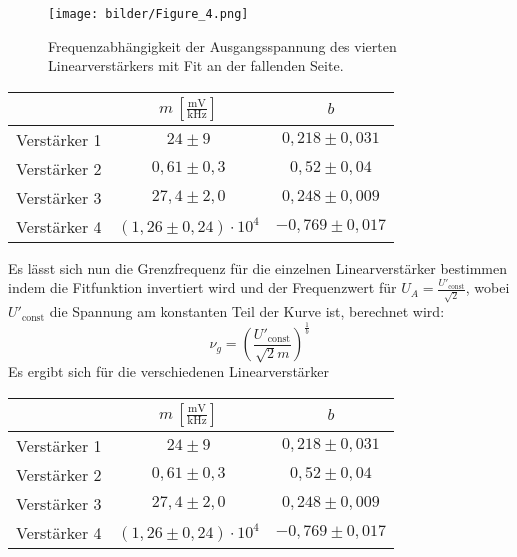 \begin{figure}[h]
  \centering
  \texttt{[image: bilder/Figure\_4.png]}
  \caption{Frequenzabhängigkeit der Ausgangsspannung des vierten Linearverstärkers mit Fit an der fallenden Seite.}
  \label{Aufbau}
\end{figure}
\begin{table}[]
\centering
\begin{tabular}{c|cc}
&$m\,[\frac{\si{\mV}}{\si{\kHz}}]$&$b$\\
\hline
Verstärker 1 & $24\pm 9$ & $0{,}218\pm 0{,}031$\\
Verstärker 2 & $0{,}61\pm0{,}3$ & $0{,}52\pm0{,}04$   \\
Verstärker 3 & $27{,}4\pm2{,}0$ & $0{,}248\pm0{,}009$   \\
Verstärker 4 & $(1{,}26\pm0{,}24)\cdot10^4$ & $-0{,}769\pm0{,}017$   \\
\end{tabular}
\label{Tab_1}
\end{table}
Es lässt sich nun die Grenzfrequenz für die einzelnen Linearverstärker bestimmen indem die Fitfunktion invertiert wird und der Frequenzwert für $U_A=\frac{U'_\text{const}}{\sqrt{2}}$, wobei $U'_\text{const}$ die Spannung am konstanten Teil der Kurve ist, berechnet wird:
\begin{equation}
  \nu_g=\left(\frac{U'_\text{const}}{\sqrt{2}m}\right)^{\frac{1}{b}}
\end{equation}
Es ergibt sich für die verschiedenen Linearverstärker
\begin{table}[]
\centering
\begin{tabular}{c|cc}
&$m\,[\frac{\si{\mV}}{\si{\kHz}}]$&$b$\\
\hline
Verstärker 1 & $24\pm 9$ & $0{,}218\pm 0{,}031$\\
Verstärker 2 & $0{,}61\pm0{,}3$ & $0{,}52\pm0{,}04$   \\
Verstärker 3 & $27{,}4\pm2{,}0$ & $0{,}248\pm0{,}009$   \\
Verstärker 4 & $(1{,}26\pm0{,}24)\cdot10^4$ & $-0{,}769\pm0{,}017$   \\
\end{tabular}
\label{Tab_3}
\end{table}
